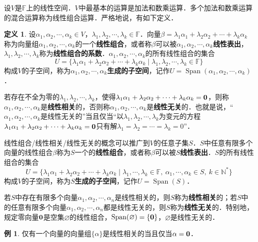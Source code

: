 \documentclass[a4paper,fontset=windows]{ctexbook}
\theoremstyle{definition}
\newtheorem{definition}{定义}[chapter]
\newtheorem{example}{例}[chapter]
\DeclareMathOperator{\Span}{Span}
\begin{document}
设$V$是$\mathbb{F}$上的线性空间．$V$中最基本的运算是加法和数乘运算．多个加法和数乘运算的混合运算称为线性组合运算．严格地说，有如下定义．

\begin{definition}\label{def8.5}
设$\alpha_1,\alpha_2,\cdots,\alpha_k\in V$，$\lambda_1,\lambda_2,\cdots,\lambda_k\in\mathbb{F}$．向量$\beta=\lambda_1\alpha_1+\lambda_2\alpha_2+\cdots+\lambda_k\alpha_k$称为向量组$\alpha_1,\alpha_2,\cdots,\alpha_k$的一个{\bf 线性组合}，或者称$\beta$可以被$\alpha_1,\alpha_2,\cdots,\alpha_k${\bf 线性表出}，$\lambda_1,\lambda_2,\cdots,\lambda_k$称为{\bf 线性组合的系数}．$\alpha_1,\alpha_2,\cdots,\alpha_k$的所有线性组合的集合
$$U=\{\lambda_1\alpha_1+\lambda_2\alpha_2+\cdots+\lambda_k\alpha_k\mid\lambda_1,\lambda_2,\cdots,\lambda_k\in\mathbb{F}\}$$
构成$V$的子空间，称为$\alpha_1,\alpha_2,\cdots,\alpha_k${\bf 生成的子空间}，记作$U=\Span(\alpha_1,\alpha_2,\cdots,\alpha_k)$．

若存在不全为零的$\lambda_1,\lambda_2,\cdots,\lambda_k$，使得$\lambda_1\alpha_1+\lambda_2\alpha_2+\cdots+\lambda_k\alpha_k={\bf 0}$，则称$\alpha_1,\alpha_2,\cdots,\alpha_k$是{\bf 线性相关}的，否则称$\alpha_1,\alpha_2,\cdots,\alpha_k$是{\bf 线性无关}的．也就是说，“$\alpha_1,\alpha_2,\cdots,\alpha_k$是线性无关的”当且仅当“以$\lambda_1,\lambda_2,\cdots,\lambda_k$为变元的方程$\lambda_1\alpha_1+\lambda_2\alpha_2+\cdots+\lambda_k\alpha_k={\bf 0}$只有解$\lambda_1=\lambda_2=\cdots=\lambda_k=0$”．

\medskip 线性组合/线性相关/线性无关的概念可以推广到$V$的任意子集$S$．$S$中任意有限多个向量的线性组合$\beta$称为$S$一个的{\bf 线性组合}，或者称$\beta$可以被$S${\bf 线性表出}．$S$的所有线性组合的集合
$$U=\{\lambda_1\alpha_1+\lambda_2\alpha_2+\cdots+\lambda_k\alpha_k\mid\lambda_1,\cdots,\lambda_k\in\mathbb{F},~\alpha_1,\cdots,\alpha_k\in S,~k\in\mathbb{N}^*\}$$
构成$V$的子空间，称为$S${\bf 生成的子空间}，记作$U=\Span(S)$．

若$S$中存在有限多个向量$\alpha_1,\alpha_2,\cdots,\alpha_n$是线性相关的，则$S$称为{\bf 线性相关}的；若$S$中的任意有限多个向量$\alpha_1,\alpha_2,\cdots,\alpha_n$都是线性无关的，则$S$称为{\bf 线性无关}的．特别地，规定零向量${\bf 0}$是空集$\varnothing$的线性组合，$\Span(\varnothing)=\{\bf 0\}$，$\varnothing$是线性无关的．
\end{definition}

\begin{example}
仅有一个向量的向量组$\{\alpha\}$是线性相关的当且仅当$\alpha={\bf 0}$．
\end{example}
\end{document}
